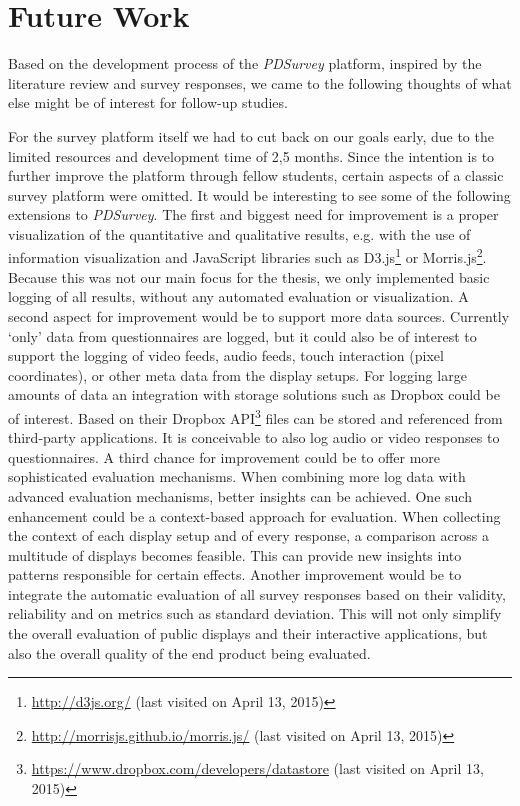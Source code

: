 \section{Future Work}
\label{chapter:future-work}
	
Based on the development process of the \textit{PDSurvey} platform, inspired by the literature review and survey responses, we came to the following thoughts of what else might be of interest for follow-up studies.


For the survey platform itself we had to cut back on our goals early, due to the limited resources and development time of 2,5 months. Since the intention is to further improve the platform through fellow students, certain aspects of a classic survey platform were omitted. It would be interesting to see some of the following extensions to \textit{PDSurvey}.
The first and biggest need for improvement is a proper visualization of the quantitative and qualitative results, e.g. with the use of information visualization and JavaScript libraries such as D3.js\footnote{\url{http://d3js.org/} (last visited on April 13, 2015)} or Morris.js\footnote{\url{http://morrisjs.github.io/morris.js/} (last visited on April 13, 2015)}. Because this was not our main focus for the thesis, we only implemented basic logging of all results, without any automated evaluation or visualization.
A second aspect for improvement would be to support more data sources. Currently `only' data from questionnaires are logged, but it could also be of interest to support the logging of video feeds, audio feeds, touch interaction (pixel coordinates), or other meta data from the display setups. For logging large amounts of data an integration with storage solutions such as Dropbox could be of interest. Based on their Dropbox API\footnote{\url{https://www.dropbox.com/developers/datastore} (last visited on April 13, 2015)} files can be stored and referenced from third-party applications. It is conceivable to also log audio or video responses to questionnaires.
A third chance for improvement could be to offer more sophisticated evaluation mechanisms. When combining more log data with advanced evaluation mechanisms, better insights can be achieved. One such enhancement could be a context-based approach for evaluation. When collecting the context of each display setup and of every response, a comparison across a multitude of displays becomes feasible. This can provide new insights into patterns responsible for certain effects. Another improvement would be to integrate the automatic evaluation of all survey responses based on their validity, reliability and on metrics such as standard deviation. This will not only simplify the overall evaluation of public displays and their interactive applications, but also the overall quality of the end product being evaluated.

